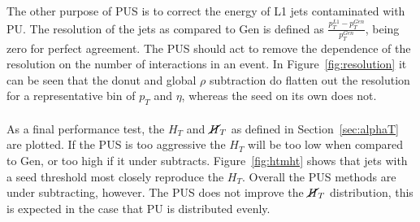 \\\\
\noindent The other purpose of PUS is to correct the energy of L1 jets contaminated with PU. The resolution of the jets as compared to Gen is defined as $\frac{p_T^{L1}-p_T^{Gen}}{p_T^{Gen}}$, being zero for perfect agreement. The PUS should act to remove the dependence of the resolution on the number of interactions in an event. In Figure~\ref{fig:resolution} it can be seen that the donut and global $\rho$ subtraction do flatten out the resolution for a representative bin of $p_T$ and $\eta$, whereas the seed on its own does not. 
\\\\
\noindent As a final performance test, the $H_T$ and $\cancel{H}_T$ as defined in Section~\ref{sec:alphaT} are plotted. If the PUS is too aggressive the $H_T$ will be too low when compared to Gen, or too high if it under subtracts. Figure~\ref{fig:htmht} shows that jets with a seed threshold most closely reproduce the $H_T$. Overall the PUS methods are under subtracting, however. The PUS does not improve the $\cancel{H}_T$ distribution, this is expected in the case that PU is distributed evenly.
